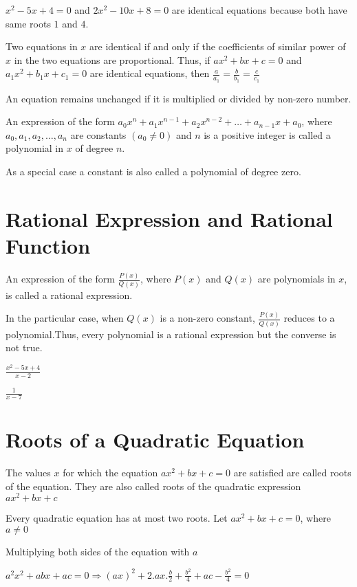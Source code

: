  $x^2 - 5x + 4 = 0$ and $2x^2 - 10x + 8 = 0$ are identical equations because both have same roots $1$ and $4$.

\startitemize[n]
\item Two equations in $x$ are identical if and only if the coefficients of similar power of $x$ in the two equations are
  proportional. Thus, if $ax^2 + bx + c = 0$ and $a_1x^2 + b_1x + c_1 = 0$ are identical equations, then $\frac{a}{a_1} =
  \frac{b}{b_1} = \frac{c}{c_1}$
\item An equation remains unchanged if it is multiplied or divided by non-zero number.
\stopitemize

An expression of the form $a_0x^n + a_1x^{n - 1} + a_2x^{n - 2} + \ldots + a_{n - 1}x + a_0$, where $a_0, a_1, a_2, \ldots, a_n$
are constants $(a_0 \neq 0)$ and $n$ is a positive integer is called a polynomial in $x$ of degree $n$.

As a special case a constant is also called a polynomial of degree zero.

\section{Rational Expression and Rational Function}
An expression of the form $\frac{P(x)}{Q(x)}$, where $P(x)$ and $Q(x)$ are polynomials in $x$, is called a rational expression.

In the particular case, when $Q(x)$ is a non-zero constant, $\frac{P(x)}{Q(x)}$ reduces to a polynomial.Thus, every polynomial is a
rational expression but the converse is not true.

\startitemize[n]
\item $\frac{x^2 - 5x + 4}{x - 2}$
\item $\frac{1}{x - 7}$
\stopitemize

\section{Roots of a Quadratic Equation}
The values $x$ for which the equation $ax^2 + bx + c = 0$ are satisfied are called roots of the equation. They are also called
roots of the quadratic expression $ax^2 + bx + c$

Every quadratic equation has at most two roots. Let $ax^2 + bx + c = 0$, where $a\neq 0$

Multiplying both sides of the equation with $a$

$a^2x^2 + abx + ac = 0 \Rightarrow (ax)^2 + 2.ax.\frac{b}{2} + \frac{b^2}{4} + ac - \frac{b^2}{4} = 0$

